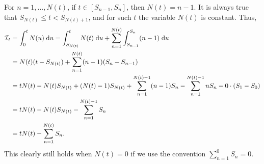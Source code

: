 \documentclass{homework}
\begin{document}
	\question
	\newcommand{\I}{\mathcal{I}}
	\begin{alphaparts}
		\questionpart For $n=1,\dots, N(t)$, if $t \in [S_{n-1}, S_n]$, then $N(t) = n-1$. It is always true that $S_{N(t)} \le t < S_{N(t) +1}$, and for such $t$ the variable $N(t)$ is constant. Thus,
		\begin{align*}
			\I_t &= \int_0^t N(u)\dee u = \int_{S_{N(t)}}^t N(t)\dee u + \sum_{n=1}^{N(t)}\int_{S_{n-1}}^{S_n} (n-1)\dee u \\
			&= N(t)(t-S_{N(t)}) + \sum_{n=1}^{N(t)} (n-1)(S_n - S_{n-1}) \\
			&= tN(t) - N(t)S_{N(t)} + (N(t) -1)S_{N(t)} + \sum_{n=1}^{N(t)-1}(n-1)S_n - \sum_{n=1}^{N(t)-1} nS_n - 0\cdot(S_1 - S_0)\\
			&= tN(t) - N(t)S_{N(t)} -\sum_{n=1}^{N(t)-1}S_n \\
			&= tN(t) - \sum_{n=1}^{N(t)}S_n.
		\end{align*}
		This clearly still holds when $N(t) = 0$ if we use the convention $\sum\limits_{n=1}^0 S_n = 0$.
		

\end{alphaparts}
\end{document}
